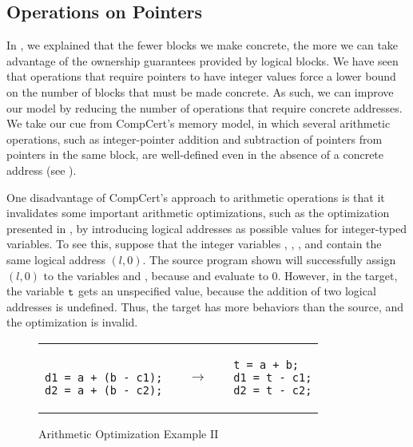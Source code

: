 \subsection{Operations on Pointers}

In , we explained that the fewer blocks we make concrete, the more we can take advantage of the ownership guarantees provided by logical blocks. We have seen that operations that require pointers to have integer values force a lower bound on the number of blocks that must be made concrete. As such, we can improve our model by reducing the number of operations that require concrete addresses. We take our cue from CompCert's memory model, in which several arithmetic operations, such as integer-pointer addition and subtraction of pointers from pointers in the
same block, are well-defined even in the absence of a concrete address (see ). 

One disadvantage of CompCert's approach to arithmetic operations is that it invalidates some important arithmetic optimizations, such as the optimization presented in , by introducing logical addresses as possible values for integer-typed variables. 
To see this, suppose that the integer variables , , , and  contain the same logical address $(l,0)$. The source program shown will successfully assign $(l,0)$ to the variables  and , because  and  evaluate to $0$. However, in the target, the variable $\texttt{t}$ gets an unspecified value, because the addition of two logical addresses is undefined. Thus, the target has more behaviors than the source, and the optimization is invalid.

\begin{figure}[t]
\center
\begin{tabular}{lll}
\begin{minipage}{0.3\textwidth}
\begin{verbatim}

d1 = a + (b - c1);
d2 = a + (b - c2);
\end{verbatim}
\end{minipage}
&
$\quad\rightarrow\quad$
&
\begin{minipage}{0.3\textwidth}
\begin{verbatim}
t = a + b;
d1 = t - c1;
d2 = t - c2;
\end{verbatim}
\end{minipage}
\end{tabular}
\caption{Arithmetic Optimization Example II}\label{fig:intptrcast:formal-semantics:arith2}
\end{figure}

